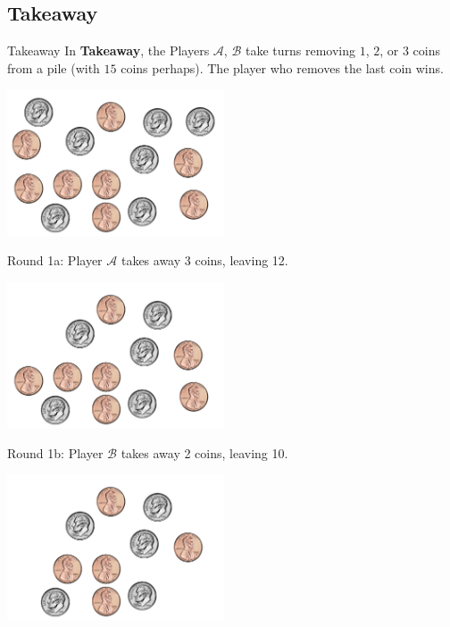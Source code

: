 \documentclass{beamer}
\theoremstyle{theorem}
\theoremstyle{definition}
\newcommand{\<}{\langle}
\renewcommand{\>}{\rangle}
\newcommand{\pl}[1]{\mathscr{#1}}
\newcommand{\term}[1]{\textbf{#1}}
\begin{document}
\subsection{Takeaway}

\begin{frame}{Takeaway}
  In \term{Takeaway}, the Players $\pl A$, $\pl B$ take turns removing $1$,
  $2$, or $3$ coins from a pile (with $15$ coins perhaps). The player who
  removes the last coin wins.

  \vspace{1em}

  \centerline{
    \includegraphics[height=1.7in]{takeawayCoins/15.pdf}
  }
\end{frame}

\begin{frame}
  Round 1a: Player $\pl A$ takes away 3 coins, leaving 12.

  \centerline{
    \includegraphics[height=1.7in]{takeawayCoins/12.pdf}
  }
\end{frame}

\begin{frame}
  Round 1b: Player $\pl B$ takes away 2 coins, leaving 10.

  \centerline{
    \includegraphics[height=1.7in]{takeawayCoins/10.pdf}
  }
\end{frame}
\end{document}
